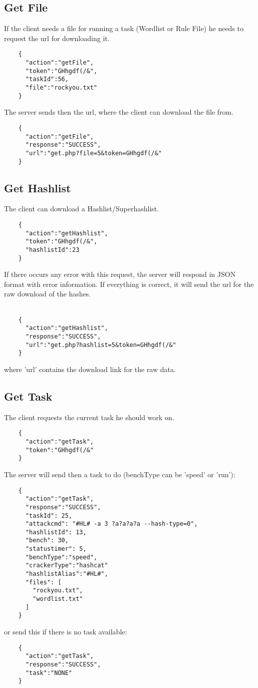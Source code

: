 \documentclass{article}
\begin{document}
	\subsection*{Get File}
	If the client needs a file for running a task (Wordlist or Rule File) he needs to request the url for downloading it.
	\begin{verbatim}
	{
	  "action":"getFile",
	  "token":"GHhgdf(/&",
	  "taskId":56,
	  "file":"rockyou.txt"
	}
	\end{verbatim}
	The server sends then the url, where the client can download the file from.
	\begin{verbatim}
	{
	  "action":"getFile",
	  "response":"SUCCESS",
	  "url":"get.php?file=5&token=GHhgdf(/&"
	}
	\end{verbatim}
	
	\subsection*{Get Hashlist}
	The client can download a Hashlist/Superhashlist.
	\begin{verbatim}
	{
	  "action":"getHashlist",
	  "token":"GHhgdf(/&",
	  "hashlistId":23
	}
	\end{verbatim}
	If there occurs any error with this request, the server will respond in JSON format with error information. If everything is correct, it will send the url for the raw download of the hashes.\\\\
	\begin{verbatim}
	{
	  "action":"getHashlist",
	  "response":"SUCCESS",
	  "url":"get.php?hashlist=5&token=GHhgdf(/&"
	}
	\end{verbatim}
	where 'url' contains the download link for the raw data.
	
	\subsection*{Get Task}
	The client requests the current task he should work on.
	\begin{verbatim}
	{
	  "action":"getTask",
	  "token":"GHhgdf(/&"
	}
	\end{verbatim}
	The server will send then a task to do (benchType can be 'speed' or 'run'):
	\begin{verbatim}
	{
	  "action":"getTask",
	  "response":"SUCCESS",
	  "taskId": 25,
	  "attackcmd": "#HL# -a 3 ?a?a?a?a --hash-type=0",
	  "hashlistId": 13,
	  "bench": 30,
	  "statustimer": 5,
	  "benchType":"speed",
	  "crackerType":"hashcat"
	  "hashlistAlias":"#HL#",
	  "files": [
	    "rockyou.txt",
	    "wordlist.txt"
	  ]
	}
	\end{verbatim}
	or send this if there is no task available:
	\begin{verbatim}
	{
	  "action":"getTask",
	  "response":"SUCCESS",
	  "task":"NONE"
	}
	\end{verbatim}
	
\end{document}
